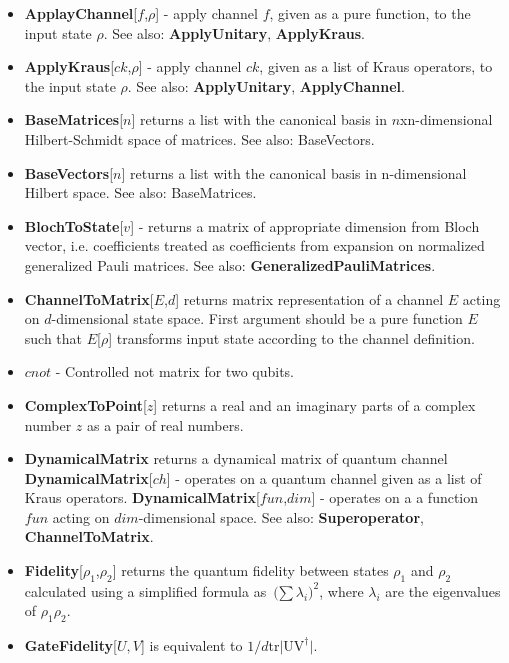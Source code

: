 \documentclass[a4paper,10pt]{scrartcl}
\begin{document}
\begin{itemize} 
\item  \textbf{ApplayChannel}[$f$,$\rho$] - apply channel $f$, given as a pure function, to the input state $\rho$. See also: \textbf{ApplyUnitary}, \textbf{ApplyKraus}.
\item  \textbf{ApplyKraus}[$ck$,$\rho$] - apply channel $ck$, given as a list of Kraus operators, to the input state $\rho$. See also: \textbf{ApplyUnitary}, \textbf{ApplyChannel}.
\item  \textbf{BaseMatrices}[$n$] returns a list with the canonical basis in $n$xn-dimensional Hilbert-Schmidt space of matrices. See also: BaseVectors.
\item  \textbf{BaseVectors}[$n$] returns a list with the canonical basis in n-dimensional Hilbert space. See also: BaseMatrices.
\item  \textbf{BlochToState}[$v$] - returns a matrix of appropriate dimension from Bloch vector, i.e. coefficients treated as coefficients from expansion on normalized generalized Pauli matrices. See also: \textbf{GeneralizedPauliMatrices}.
\item  \textbf{ChannelToMatrix}[$E$,$d$] returns matrix representation of a channel $E$ acting on $d$-dimensional state space. First argument should be a pure function $E$ such that $E$[$\rho$] transforms input state according to the channel definition.
\item  $cnot$ - Controlled not matrix for two qubits.
\item  \textbf{ComplexToPoint}[$z$] returns a real and an imaginary parts of a complex number $z$ as a pair of real numbers.
\item  \textbf{DynamicalMatrix} returns a dynamical matrix of quantum channel\newline{}
\textbf{DynamicalMatrix}[$ch$] -  operates on a quantum channel given as a list of Kraus operators.\newline{}
\textbf{DynamicalMatrix}[$fun$,$dim$]  - operates on a a function $fun$ acting on $dim$-dimensional space. \newline{}
See also: \textbf{Superoperator}, \textbf{ChannelToMatrix}.
\item  \textbf{Fidelity}[$\rho _1$,$\rho _2$] returns the quantum fidelity between states $\rho _1$ and $\rho _2$ calculated using a simplified formula as $\text{($\sum $}\lambda _i)^2$, where $\lambda _i$ are the eigenvalues of $\rho _1\rho _2$.
\item  \textbf{GateFidelity}[$U,V$] is equivalent to $1/d\text{tr$|$UV} ^{\dagger }|$.

\end{itemize}
\end{document}
